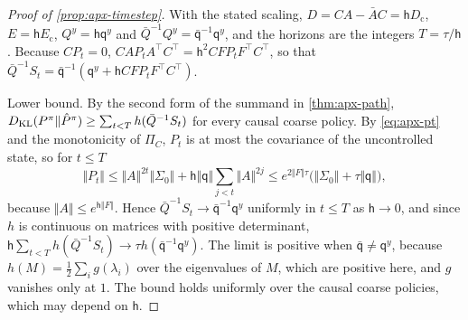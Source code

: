 \begin{proof}[Proof of \cref{prop:apx-timestep}]
With the stated scaling, $D=CA-\bar AC=\mathsf hD_{\mathrm c}$, $E=\mathsf hE_{\mathrm c}$, $Q^y=\mathsf h\mathsf q^y$ and $\bar Q^{-1}Q^y=\bar{\mathsf q}^{-1}\mathsf q^y$, and the horizons are the integers $T=\tau/\mathsf h$. Because $CP_t=0$, $CAP_tA^\top C^\top=\mathsf h^2CFP_tF^\top C^\top$, so that $\bar Q^{-1}S_t=\bar{\mathsf q}^{-1}(\mathsf q^y+\mathsf hCFP_tF^\top C^\top)$.

Lower bound. By the second form of the summand in \cref{thm:apx-path}, $D_{\mathrm{KL}}(P^\pi\Vert\hat P^\pi)\ge\sum_{t<T}h(\bar Q^{-1}S_t)$ for every causal coarse policy. By \cref{eq:apx-pt} and the monotonicity of $\Pi_C$, $P_t$ is at most the covariance of the uncontrolled state, so for $t\le T$
\begin{equation*}
\Vert P_t\Vert\le\Vert A\Vert^{2t}\Vert\Sigma_0\Vert+\mathsf h\Vert\mathsf q\Vert\sum_{j<t}\Vert A\Vert^{2j}\le e^{2\Vert F\Vert\tau}\bigl(\Vert\Sigma_0\Vert+\tau\Vert\mathsf q\Vert\bigr),
\end{equation*}
because $\Vert A\Vert\le e^{\mathsf h\Vert F\Vert}$. Hence $\bar Q^{-1}S_t\to\bar{\mathsf q}^{-1}\mathsf q^y$ uniformly in $t\le T$ as $\mathsf h\to0$, and since $h$ is continuous on matrices with positive determinant, $\mathsf h\sum_{t<T}h(\bar Q^{-1}S_t)\to\tau h(\bar{\mathsf q}^{-1}\mathsf q^y)$. The limit is positive when $\bar{\mathsf q}\ne\mathsf q^y$, because $h(M)=\frac12\sum_ig(\lambda_i)$ over the eigenvalues of $M$, which are positive here, and $g$ vanishes only at $1$. The bound holds uniformly over the causal coarse policies, which may depend on $\mathsf h$.


\end{proof}
